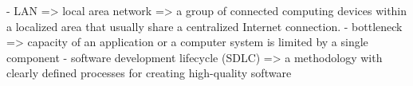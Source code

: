 - LAN => local area network => a group of connected computing devices within a localized area that usually share a centralized Internet connection.
- bottleneck  => capacity of an application or a computer system is limited by a single component
- software development lifecycle (SDLC) => a methodology with clearly defined processes for creating high-quality software

